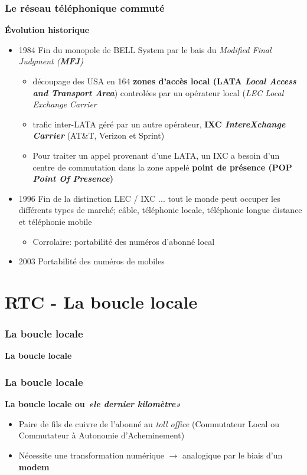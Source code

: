 \begin{frame}[fragile]
  \frametitle{Le réseau téléphonique commuté}
{\large\bf Évolution historique}
\begin{itemize}
	\item 1984 Fin du monopole de BELL System par le bais du 
	\textit{Modified Final Judgment (\textbf{MFJ})}
	\begin{itemize}
		\item découpage des USA en 164 \textbf{zones d'accès local 
		(LATA \textit{Local Access and Transport Area}}) controlées par un
		opérateur local (\textit{LEC Local Exchange Carrier}
		\item trafic inter-LATA géré par un autre opérateur,
		\textbf{IXC \textit{IntereXchange Carrier}} (AT\&T, Verizon et Sprint)
		\item Pour traiter un appel provenant d'une LATA, un IXC a besoin d'un
		centre de commutation dans la zone appelé \textbf{point de présence (POP
		\textit{Point Of Presence})}
	\end{itemize}
	\item 1996 Fin de la distinction LEC / IXC ... tout le monde peut occuper
	les différents types de marché; câble, téléphonie locale, téléphonie longue
	distance et téléphonie mobile
	\begin{itemize}
	 	\item Corrolaire: portabilité des numéros d'abonné local
	\end{itemize}
	\item 2003 Portabilité des numéros de mobiles
\end{itemize}
\end{frame}

\section{RTC - La boucle locale}

\begin{frame}[fragile]
	\frametitle{La boucle locale}
\begin{center}
	{\Huge\bf\color{blue} La boucle locale}
\end{center}
\end{frame}

\begin{frame}[fragile]
  \frametitle{La boucle locale}
{\large\bf La \textbf{boucle locale} ou \textit{«le dernier kilomètre»}}
\begin{itemize}
	\item Paire de fils de cuivre de l'abonné au \textit{toll office}
	(Commutateur Local ou Commutateur à Autonomie d'Acheminement) 
	\item Nécessite une transformation numérique $\rightarrow$ analogique par le
	biais d'un \textbf{modem}
\end{itemize}
\end{frame}



